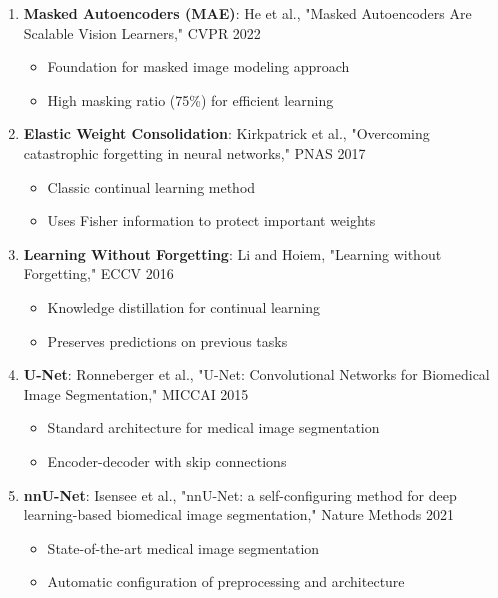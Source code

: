 \documentclass[conference]{IEEEtran}
\begin{document}
\begin{enumerate}
    \item \textbf{Masked Autoencoders (MAE)}: He et al., "Masked Autoencoders Are Scalable Vision Learners," CVPR 2022
    \begin{itemize}
        \item Foundation for masked image modeling approach
        \item High masking ratio (75\%) for efficient learning
    \end{itemize}
    
    \item \textbf{Elastic Weight Consolidation}: Kirkpatrick et al., "Overcoming catastrophic forgetting in neural networks," PNAS 2017
    \begin{itemize}
        \item Classic continual learning method
        \item Uses Fisher information to protect important weights
    \end{itemize}
    
    \item \textbf{Learning Without Forgetting}: Li and Hoiem, "Learning without Forgetting," ECCV 2016
    \begin{itemize}
        \item Knowledge distillation for continual learning
        \item Preserves predictions on previous tasks
    \end{itemize}
    
    \item \textbf{U-Net}: Ronneberger et al., "U-Net: Convolutional Networks for Biomedical Image Segmentation," MICCAI 2015
    \begin{itemize}
        \item Standard architecture for medical image segmentation
        \item Encoder-decoder with skip connections
    \end{itemize}
    
    \item \textbf{nnU-Net}: Isensee et al., "nnU-Net: a self-configuring method for deep learning-based biomedical image segmentation," Nature Methods 2021
    \begin{itemize}
        \item State-of-the-art medical image segmentation
        \item Automatic configuration of preprocessing and architecture
    \end{itemize}
\end{enumerate}
\end{document}

